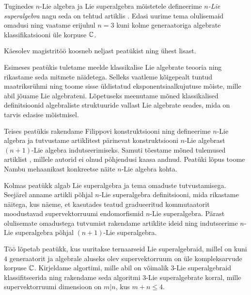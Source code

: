 Tuginedes $n$-Lie algebra ja Lie superalgebra mõistetele defineerime
\emph{$n$-Lie superalgebra} nagu seda on tehtud artiklis \cite{Abramov:2014}.
Edasi uurime tema olulisemaid omadusi ning vaatame erijuhul $n = 3$ kuni
kolme generaatoriga algebrate klassifikatsiooni üle korpuse $\mathbb{C}$.

\bigskip

Käesolev magistritöö koosneb neljast peatükist ning ühest lisast.

Esimeses peatükis tuletame meelde klassikalise Lie algebrate teooria ning
rikastame seda mitmete näidetega. Selleks vaatleme kõigepealt tuntud
maatriksrühmi ning toome sisse üldistatud eksponentsiaalkujutuse mõiste,
mille abil jõuame Lie algebrateni. Lõpetuseks meenutame mõned klassikalised
definitsioonid algebraliste struktuuride vallast Lie algebrate seades, mida
on tarvis edasise mõistmisel.

Teises peatükis rakendame Filippovi konstruktsiooni ning defineerime $n$-Lie
algebra ja tutvustame artiklitest \cite{AKMS:2014, AMS:2011}
pärinevat konstruktsiooni $n$-Lie algebrast $(n+1)$-Lie algebra indutseerimiseks.
Samuti tõestame mõned tulemused artiklist \cite{AKMS:2014}, millele autorid
ei olnud põhjendusi kaasa andnud. Peatüki lõpus toome Nambu mehaanikast
konkreetse näite $n$-Lie algebra kohta.

Kolmas peatükk algab Lie superalgebra ja tema omaduste tutvustamisega. Seejärel
anname artikli \cite{Abramov:2014} põhjal $n$-Lie superalgebra definitsiooni,
mida rikastame näitega, kus näeme, et kasutades teatud gradueeritud
kommutaatorit moodustavad supervektorruumi endomorfismid $n$-Lie superalgebra.
Pärast olulisemate omadustega tutvumist rakendame artiklite
\cite{Abramov:2014,AKMS:2014} ideid ning indutseerime $n$-Lie superalgebra
põhjal $(n+1)$-Lie superalgebra.

Töö lõpetab peatükk, kus uuritakse ternaarseid Lie superalgebraid, millel
on kuni $4$ generaatorit ja algebrale aluseks olev supervektorruum on
üle kompleksarvude korpuse $\mathbb{C}$. Kirjeldame algortimi, mille abil on võimalik
$3$-Lie superalgebraid klassifitseerida ning rakendame seda algoritmi
$3$-Lie superalgebrate korral, mille supervektorruumi dimensioon on $m|n$, kus
$m + n \leq 4$.

\bigskip

